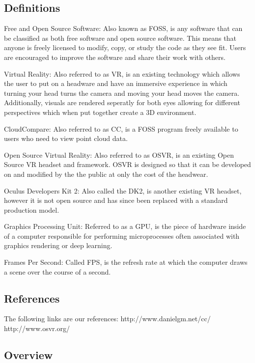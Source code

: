 \documentclass{article}
\begin{document}
\subsection{Definitions}

Free and Open Source Software: Also known as FOSS, is any software that can be classified as both free software and open source software. This means that anyone is freely licensed to modify, copy, or study the code as they see fit. 
Users are encouraged to improve the software and share their work with others.

Virtual Reality: Also referred to as VR, is an existing technology which allows the user to put on a headware and have an immersive experience in which turning your head turns the camera and moving your head moves the camera.
Additionally, visuals are rendered seperatly for both eyes allowing for different perspectives which when put together create a 3D environment.

CloudCompare: Also referred to as CC, is a FOSS program freely available to users who need to view point cloud data.

Open Source Virtual Reality: Also referred to as OSVR, is an existing Open Source VR headset and framework. OSVR is designed so that it can be developed on and modified by the the public at only the cost of the headwear.

Oculus Developers Kit 2: Also called the DK2, is another existing VR headset, however it is not open source and has since been replaced with a standard production model.

Graphics Processing Unit: Referred to as a GPU, is the piece of hardware inside of a computer responsible for performing microprocesses often associated with graphics rendering or deep learning.

Frames Per Second: Called FPS, is the refresh rate at which the computer draws a scene over the course of a second.

\subsection{References}

The following links are our references:
  http://www.danielgm.net/cc/
  http://www.osvr.org/

\subsection{Overview}
\end{document}
